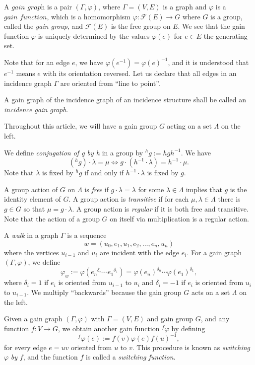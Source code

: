 \documentclass[11pt]{article}
\theoremstyle{definition}
\begin{document}
A $\textit{gain graph}$ is a pair $(\Gamma,\varphi)$, where $\Gamma = (V,E)$ is a graph and $\varphi$ is a $\textit{gain function}$, which is a homomorphism $\varphi : \mathscr{F}(E) \rightarrow G$ where $G$ is a group, called the \textit{gain group}, and $\mathscr{F}(E)$ is the free group on $E$.  We see that the gain function $\varphi$ is uniquely determined by the values $\varphi(e)$ for $e \in E$ the generating set.

Note that for an edge $e$, we have $\varphi(e^{-1}) = \varphi(e)^{-1}$, and it is understood that $e^{-1}$ means $e$ with its orientation reversed.  Let us declare that all edges in an incidence graph $\Gamma$ are oriented from ``line to point''. 

A gain graph of the incidence graph of an incidence structure shall be called an \textit{incidence gain graph}.

Throughout this article, we will have a gain group $G$ acting on a set $\Lambda$ on the left.  

We define \textit{conjugation of g by h} in a group by ${}^hg := h g h^{-1} $.  We have $$({}^hg) \cdot \lambda = \mu \Longleftrightarrow g \cdot (h^{-1} \cdot \lambda) = h^{-1} \cdot \mu.$$  Note that $\lambda$ is fixed by ${}^hg$ if and only if $h^{-1} \cdot \lambda$ is fixed by $g$.

A group action of $G$ on $\Lambda$ is \textit{free} if $g \cdot \lambda = \lambda$ for some $\lambda \in \Lambda$ implies that $g$ is the identity element of $G$.  A group action is \textit{transitive} if for each $\mu, \lambda \in \Lambda$ there is $g \in G$ so that $\mu = g \cdot \lambda$.  A group action is \textit{regular} if it is both free and transitive.  Note that the action of a group $G$ on itself via multiplication is a regular action.

A \textit{walk} in a graph $\Gamma$ is a sequence $$w = (u_0,e_1,u_1,e_2,\dots ,e_n,u_n)$$ where the vertices $u_{i-1}$ and $u_i$ are incident with the edge $e_i$.  For a gain graph $(\Gamma,\varphi)$, we define $$ \varphi_w := \varphi({e_n}^{\delta_n} \cdots {e_1}^{\delta_1}) = \varphi(e_n)^{\delta_n} \cdots \varphi(e_1)^{\delta_1},$$ where $\delta_i = 1$ if $e_i$ is oriented from $u_{i-1}$ to $u_i$ and $\delta_i = -1$ if $e_i$ is oriented from $u_i$ to $u_{i-1}$.  We multiply ``backwards'' because the gain group $G$ acts on a set $\Lambda$ on the left.

Given a gain graph $(\Gamma,\varphi)$ with $\Gamma = (V,E)$ and gain group $G$, and any function $f : V \rightarrow G$, we obtain another gain function ${}^f\varphi$ by defining $${}^f\varphi (e) := f(v)\varphi(e)f(u)^{-1},$$
for every edge $e = uv$ oriented from $u$ to $v$.  This procedure is known as \textit{switching} $\varphi$ \textit{by} $f$, and the function $f$ is called a \textit{switching function}.
\end{document}
